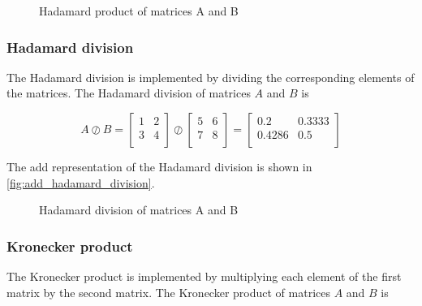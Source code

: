 \begin{figure}
    \centering
    
    \caption{Hadamard product of matrices A and B}
    \label{fig:add_hadamard}
\end{figure}

\subsubsection{Hadamard division}
The Hadamard division is implemented by dividing the corresponding elements of the matrices.
The Hadamard division of matrices $A$ and $B$ is

\[
    A \oslash B = \begin{bmatrix}
                      1 & 2 \\
                      3 & 4 \\
    \end{bmatrix} \oslash \begin{bmatrix}
                              5 & 6 \\
                              7 & 8 \\
    \end{bmatrix} = \begin{bmatrix}
                        0.2    & 0.3333 \\
                        0.4286 & 0.5    \\
    \end{bmatrix}
\]

The \gls{add} representation of the Hadamard division is shown in \autoref{fig:add_hadamard_division}.

\begin{figure}
    \centering
    
    \caption{Hadamard division of matrices A and B}
    \label{fig:add_hadamard_division}
\end{figure}

\subsubsection{Kronecker product}
The Kronecker product is implemented by multiplying each element of the first matrix by the second matrix.
The Kronecker product of matrices $A$ and $B$ is


